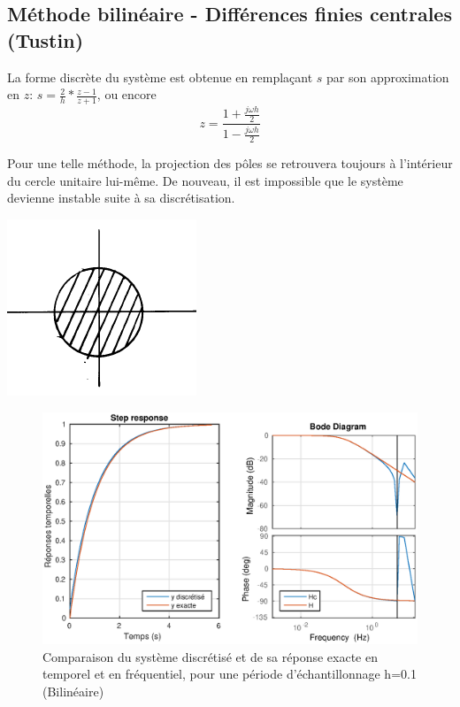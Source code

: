 \subsection{Méthode bilinéaire - Différences finies centrales (Tustin)}
 
La forme discrète du système est obtenue en remplaçant $s$ par son approximation en $z$:  $s=\frac{2}{h}*\frac{z-1}{z+1}$, ou encore
\begin{equation}
z = \frac{1+\frac{j\omega h}{2}}{1-\frac{j\omega h}{2}}
\end{equation}

\begin{minipage}[b]{0.65\textwidth}
Pour une telle méthode, la projection des pôles se retrouvera toujours à l'intérieur du cercle unitaire lui-même. De nouveau, il est impossible que le système devienne instable suite à sa discrétisation.
\end{minipage}\hfill
\begin{minipage}[c]{0.3\textwidth}
  \includegraphics[scale=.6]{images/labo1-dom-centre} 
\end{minipage}

\begin{figure}[!h]
\center\includegraphics[width=1\linewidth]{eps/labo1-centre-step}
\caption{Comparaison du système discrétisé et de sa réponse exacte en temporel et en fréquentiel, pour une période d'échantillonnage h=0.1 (Bilinéaire)}
\label{labo1-centre-step}
\end{figure}


